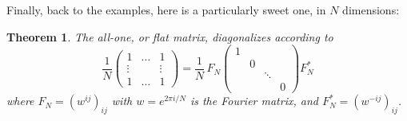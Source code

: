\documentclass[12pt]{amsbook}
\newtheorem{theorem}{Theorem}[chapter]
\begin{document}
Finally, back to the examples, here is a particularly sweet one, in $N$ dimensions:


\begin{theorem}
The all-one, or flat matrix, diagonalizes according to
$$\frac{1}{N}\begin{pmatrix}
1&\ldots&1\\
\vdots&&\vdots\\
1&\ldots&1\end{pmatrix}=\frac{1}{N}\,F_N
\begin{pmatrix}
1\\
&0\\
&&\ddots\\
&&&0\end{pmatrix}
F_N^*$$
where $F_N=(w^{ij})_{ij}$ with $w=e^{2\pi i/N}$ is the Fourier matrix, and $F_N^*=(w^{-ij})_{ij}$.
\end{theorem}
\end{document}
